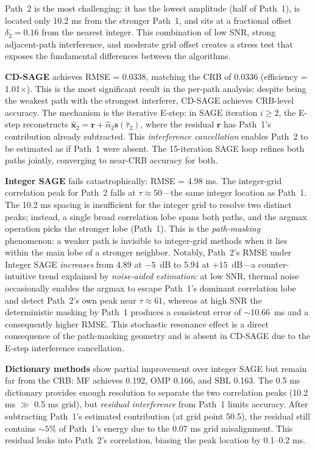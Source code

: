 \documentclass[a4paper,fleqn]{cas-dc}
\begin{document}
Path~2 is the most challenging: it has the lowest amplitude (half of Path~1), is located only 10.2 ms from the stronger Path~1, and sits at a fractional offset $\delta_2 = 0.16$ from the nearest integer. This combination of low SNR, strong adjacent-path interference, and moderate grid offset creates a stress test that exposes the fundamental differences between the algorithms.

\textbf{CD-SAGE} achieves RMSE = 0.0338, matching the CRB of 0.0336 (efficiency = 1.01$\times$). This is the most significant result in the per-path analysis: despite being the weakest path with the strongest interferer, CD-SAGE achieves CRB-level accuracy. The mechanism is the iterative E-step: in SAGE iteration $i \ge 2$, the E-step reconstructs $\hat{\mathbf{x}}_2 = \mathbf{r} + \hat{\alpha}_2\mathbf{s}(\hat{\tau}_2)$, where the residual $\mathbf{r}$ has Path~1's contribution already subtracted. This \textit{interference cancellation} enables Path~2 to be estimated as if Path~1 were absent. The 15-iteration SAGE loop refines both paths jointly, converging to near-CRB accuracy for both.

\textbf{Integer SAGE} fails catastrophically: RMSE = 4.98 ms. The integer-grid correlation peak for Path~2 falls at $\tau \approx 50$---the same integer location as Path~1. The 10.2 ms spacing is insufficient for the integer grid to resolve two distinct peaks; instead, a single broad correlation lobe spans both paths, and the argmax operation picks the stronger lobe (Path~1). This is the \textit{path-masking} phenomenon: a weaker path is invisible to integer-grid methods when it lies within the main lobe of a stronger neighbor. Notably, Path~2's RMSE under Integer SAGE \textit{increases} from 4.89 at $-5$~dB to 5.94 at $+15$~dB---a counter-intuitive trend explained by \textit{noise-aided estimation}: at low SNR, thermal noise occasionally enables the argmax to escape Path~1's dominant correlation lobe and detect Path~2's own peak near $\tau\approx61$, whereas at high SNR the deterministic masking by Path~1 produces a consistent error of $\sim$10.66~ms and a consequently higher RMSE. This stochastic resonance effect is a direct consequence of the path-masking geometry and is absent in CD-SAGE due to the E-step interference cancellation.

\textbf{Dictionary methods} show partial improvement over integer SAGE but remain far from the CRB: MF achieves 0.192, OMP 0.166, and SBL 0.163. The 0.5 ms dictionary provides enough resolution to separate the two correlation peaks (10.2 ms $\gg$ 0.5 ms grid), but \textit{residual interference} from Path~1 limits accuracy. After subtracting Path~1's estimated contribution (at grid point 50.5), the residual still contains $\sim 5\%$ of Path~1's energy due to the 0.07 ms grid misalignment. This residual leaks into Path~2's correlation, biasing the peak location by 0.1--0.2 ms.
\end{document}
